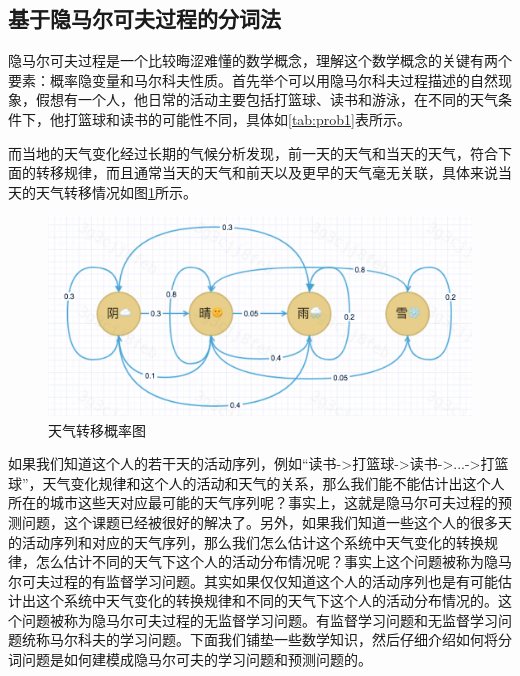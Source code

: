 \documentclass[twoside,a4paper,12pt]{book}%
\begin{document}
\subsection{基于隐马尔可夫过程的分词法}
隐马尔可夫过程是一个比较晦涩难懂的数学概念，理解这个数学概念的关键有两个要素：概率隐变量和马尔科夫性质。首先举个可以用隐马尔科夫过程描述的自然现象，假想有一个人，他日常的活动主要包括打篮球、读书和游泳，在不同的天气条件下，他打篮球和读书的可能性不同，具体如\ref{tab:prob1}表所示。
\begin{table} [h]
    \caption{天气和活动}
	\label{tab:prob1}
	\centering
\end{table}  
而当地的天气变化经过长期的气候分析发现，前一天的天气和当天的天气，符合下面的转移规律，而且通常当天的天气和前天以及更早的天气毫无关联，具体来说当天的天气转移情况如图\ref{tab:prob2}所示。
\begin{figure}[htbp]
\begin{center}
\includegraphics[width=5.5in]{figures/hmm2.png}
\caption{天气转移概率图}
\label{tab:prob2}
\end{center}
\end{figure}


如果我们知道这个人的若干天的活动序列，例如“读书->打篮球->读书->...->打篮球”，天气变化规律和这个人的活动和天气的关系，那么我们能不能估计出这个人所在的城市这些天对应最可能的天气序列呢？事实上，这就是隐马尔可夫过程的预测问题，这个课题已经被很好的解决了。另外，如果我们知道一些这个人的很多天的活动序列和对应的天气序列，那么我们怎么估计这个系统中天气变化的转换规律，怎么估计不同的天气下这个人的活动分布情况呢？事实上这个问题被称为隐马尔可夫过程的有监督学习问题。其实如果仅仅知道这个人的活动序列也是有可能估计出这个系统中天气变化的转换规律和不同的天气下这个人的活动分布情况的。这个问题被称为隐马尔可夫过程的无监督学习问题。有监督学习问题和无监督学习问题统称马尔科夫的学习问题。下面我们铺垫一些数学知识，然后仔细介绍如何将分词问题是如何建模成隐马尔可夫的学习问题和预测问题的。
\end{document}
